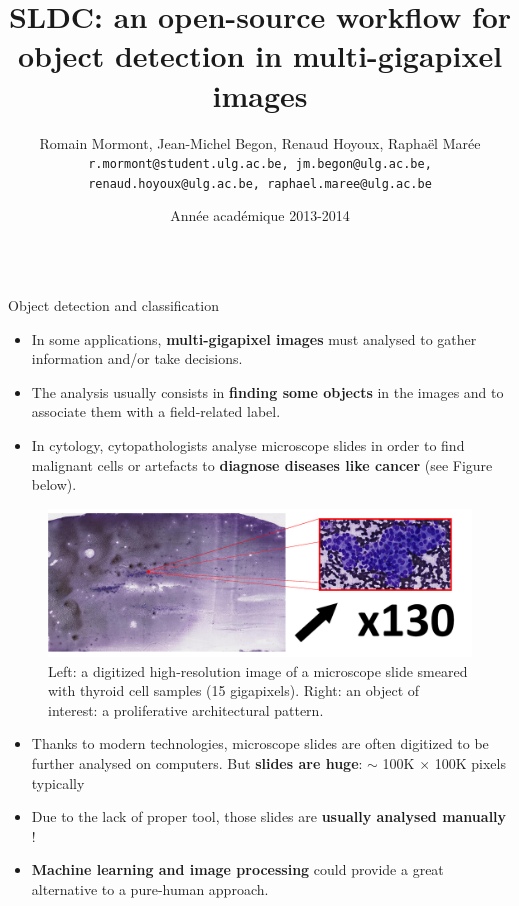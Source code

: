 \documentclass{beamer}
\title{SLDC: an open-source workflow for object detection in multi-gigapixel images}
\author{Romain Mormont, Jean-Michel Begon, Renaud Hoyoux, Raphaël Marée\\
{\tt r.mormont@student.ulg.ac.be, jm.begon@ulg.ac.be, renaud.hoyoux@ulg.ac.be, raphael.maree@ulg.ac.be}}
\institute{Systems and modeling, Department of EE \& CS, University of Liège, Belgium}
\date{Année académique 2013-2014}
\begin{document}
\begin{frame}

\vspace*{-1cm}
\begin{columns}[t]

\column{.45\paperwidth}


\begin{block}{Object detection and classification}	
\begin{itemize}
\item In some applications, \textbf{multi-gigapixel images} must analysed to gather information and/or take decisions.
\item The analysis usually consists in \textbf{finding some objects} in the images and to associate them with a field-related label.
\item In cytology, cytopathologists analyse microscope slides in order to find malignant cells or artefacts to \textbf{diagnose diseases like cancer} (see Figure below).
\end{itemize}

\begin{figure}[H]
\center
\includegraphics[scale=0.6]{images/whole-slide-dim.png}
\caption{Left: a digitized high-resolution image of a microscope slide smeared with thyroid cell samples (15 gigapixels). Right: an object of interest: a proliferative architectural pattern.}
\end{figure}

\begin{itemize}
\item Thanks to modern technologies, microscope slides are often digitized to be further analysed on computers. But \textbf{slides are huge}: $\sim$ 100K $\times$ 100K pixels typically  
\item Due to the lack of proper tool, those slides are \textbf{usually analysed manually} ! 
\item \textbf{Machine learning and image processing} could provide a great alternative to a pure-human approach.
\end{itemize}		


\end{block}
\end{columns}
\end{frame}
\end{document}
